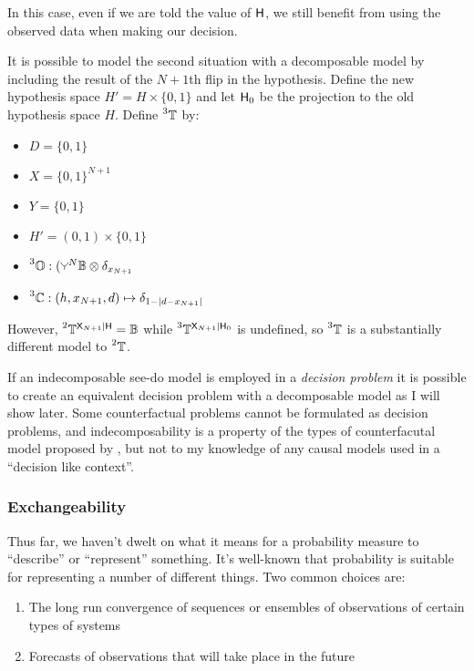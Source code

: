 In this case, even if we are told the value of $\mathsf{H}$, we still benefit from using the observed data when making our decision.

It is possible to model the second situation with a decomposable model by including the result of the $N+1$th flip in the hypothesis. Define the new hypothesis space $H'=H\times\{0,1\}$ and let $\mathsf{H}_0$ be the projection to the old hypothesis space $H$. Define $\prescript{3}{}{\ensuremath{\mathbb{T}}}$ by:

\begin{itemize}
    \item $D=\{0,1\}$
    \item $X=\{0,1\}^{N+1}$
    \item $Y=\{0,1\}$
    \item $H'=(0,1)\times\{0,1\}$
    \item $\prescript{3}{}{\kernel{O}}:(\splitter{0.1}^N\kernel{B}\otimes \delta_{x_{N+1}}$
    \item $\prescript{3}{}{\ensuremath{\mathbb{C}}}:(h,x_{N+1},d)\mapsto \delta_{1-|d-x_{N+1}|}$
\end{itemize}

However, $\prescript{2}{}{\ensuremath{\mathbb{T}}}^{\mathsf{X}_{N+1}|\mathsf{H}} = \mathbb{B}$ while $\prescript{3}{}{\ensuremath{\mathbb{T}}}^{\mathsf{X}_{N+1}|\mathsf{H}_0}$ is undefined, so $\prescript{3}{}{\ensuremath{\mathbb{T}}}$ is a substantially different model to $\prescript{2}{}{\ensuremath{\mathbb{T}}}$.

If an indecomposable see-do model is employed in a \emph{decision problem} it is possible to create an equivalent decision problem with a decomposable model as I will show later. Some counterfactual problems cannot be formulated as decision problems, and indecomposability is a property of the types of counterfacutal model proposed by \citet{pearl_causality:_2009}, but not to my knowledge of any causal models used in a ``decision like context''.

\subsubsection{Exchangeability}

Thus far, we haven't dwelt on what it means for a probability measure to ``describe'' or ``represent'' something. It's well-known that probability is suitable for representing a number of different things. Two common choices are:

\begin{enumerate}
    \item The long run convergence of sequences or ensembles of observations of certain types of systems
    \item Forecasts of observations that will take place in the future
\end{enumerate}

